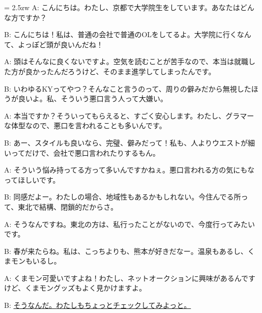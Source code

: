 \documentclass[11pt]{amsart}
\title{}
\author{}
\newenvironment{hangall}[1]{\hangindent = 2.5zw\everypar{\hangindent = 2.5zw}}{}
\begin{document}
\maketitle
\begin{hangall}{}%
A: こんにちは。わたし、京都で大学院生をしています。あなたはどんな方ですか？

B: こんにちは！私は、普通の会社で普通のOLをしてるよ。大学院に行くなんて、よっぽど頭が良いんだね！

A: 頭はそんなに良くないですよ。空気を読むことが苦手なので、本当は就職した方が良かったんだろうけど、そのまま進学してしまったんです。

B: いわゆるKYってやつ？そんなこと言うのって、周りの僻みだから無視したほうが良いよ。私、そういう悪口言う人って大嫌い。

A: 本当ですか？そういってもらえると、すごく安心します。わたし、グラマーな体型なので、悪口を言われることも多いんです。

B: あー、スタイルも良いなら、完璧、僻みだって！私も、人よりウエストが細いってだけで、会社で悪口言われたりするもん。

A: そういう悩み持ってる方って多いんですかねぇ。悪口言われる方の気にもなってほしいです。

B: 同感だよー。わたしの場合、地域性もあるかもしれない。今住んでる所って、東北で結構、閉鎖的だからさ。

A: そうなんですね。東北の方は、私行ったことがないので、今度行ってみたいです。

B: 春が来たらね。私は、こっちよりも、熊本が好きだなー。温泉もあるし、くまモンもいるし。

A: くまモン可愛いですよね！わたし、ネットオークションに興味があるんですけど、くまモングッズもよく見かけますよ。

B: \ul{そうなんだ。わたしもちょっとチェックしてみよっと。}\end{hangall}
\end{document}
